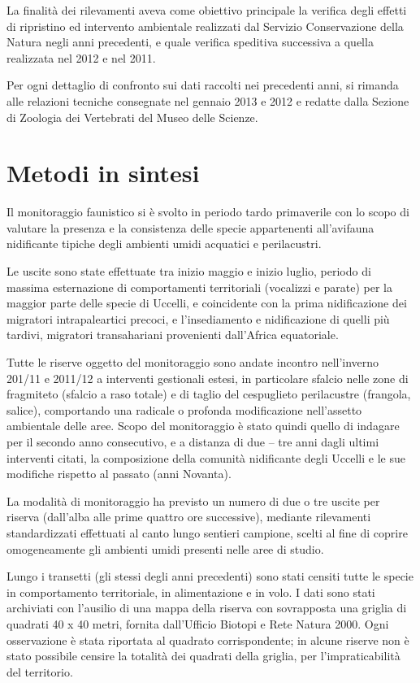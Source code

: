 \documentclass[11pt,a4paper,twoside]{memoir}
\begin{document}
La finalità dei rilevamenti aveva come obiettivo principale la verifica degli effetti di ripristino ed intervento ambientale realizzati dal Servizio Conservazione della Natura negli anni precedenti, e quale verifica speditiva successiva a quella realizzata nel 2012 e nel 2011.

Per ogni dettaglio di confronto sui dati raccolti nei precedenti anni, si rimanda alle relazioni tecniche consegnate nel gennaio 2013 e 2012 e redatte dalla Sezione di Zoologia dei Vertebrati del Museo delle Scienze. 

\section{Metodi in sintesi}
Il monitoraggio faunistico si è svolto in periodo tardo primaverile con lo scopo di valutare la presenza e la consistenza delle specie appartenenti all'avifauna nidificante tipiche degli ambienti umidi acquatici e perilacustri.

Le uscite sono state effettuate tra inizio maggio e inizio luglio, periodo di massima esternazione di comportamenti territoriali (vocalizzi e parate) per la maggior parte delle specie di Uccelli, e coincidente con la prima nidificazione dei migratori intrapaleartici precoci, e l'insediamento e nidificazione di quelli più tardivi, migratori transahariani provenienti dall'Africa equatoriale. 

Tutte le riserve oggetto del monitoraggio sono andate incontro nell'inverno 201/11 e 2011/12 a interventi gestionali estesi, in particolare sfalcio nelle zone di fragmiteto (sfalcio a raso totale) e di taglio del cespuglieto perilacustre (frangola, salice), comportando una radicale o profonda modificazione nell'assetto ambientale delle aree.
Scopo del monitoraggio è stato quindi quello di indagare per il secondo anno consecutivo, e a distanza di due – tre anni dagli ultimi interventi citati, la composizione della comunità nidificante degli Uccelli e le sue modifiche rispetto al passato (anni Novanta).

La modalità di monitoraggio ha previsto un numero di due o tre uscite per riserva (dall'alba alle prime quattro ore successive), mediante rilevamenti standardizzati effettuati al canto lungo sentieri campione, scelti al fine di coprire omogeneamente gli ambienti umidi presenti nelle aree di studio. 

Lungo i transetti (gli stessi degli anni precedenti) sono stati censiti tutte le specie in comportamento territoriale, in alimentazione e in volo. I dati sono stati archiviati con l'ausilio di una mappa della riserva con sovrapposta una griglia di quadrati 40 x 40 metri, fornita dall'Ufficio Biotopi e Rete Natura 2000. Ogni osservazione è stata riportata al quadrato corrispondente; in alcune riserve non è stato possibile censire la totalità dei quadrati della griglia, per l'impraticabilità del territorio. 
\end{document}
